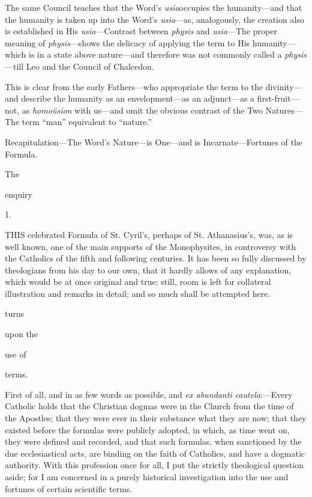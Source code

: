 The same Council teaches that
the Word's \emph{usia}occupies the humanity—and that the humanity
is taken up into the Word's \emph{usia}—as, analogously, the
creation also is established in His \emph{usia}—Contrast between \emph{physis}
and \emph{usia}—The proper meaning of \emph{physis}—shows the
delicacy of applying the term to His humanity—which is in a state
above nature—and therefore was not commonly called a \emph{physis}—till
Leo and the Council of Chalcedon.

This is clear from the early
Fathers—who appropriate the term to the divinity—and describe the
humanity as an envelopment—as an adjunct—as a first-fruit—not,
as \emph{homoüsion} with us—and omit the obvious contrast of the
Two Natures—The term ``man'' equivalent to ``nature.''

Recapitulation—The Word's
Nature—is One—and is Incarnate—Fortunes of the Formula.

\xsection{ }

The

enquiry


1.

THIS
celebrated Formula of St. Cyril's, perhaps of St. Athanasius's,
was, as is well known, one of the main supports of the
Monophysites, in controversy with the Catholics of the fifth
and following centuries. It has been so fully discussed by
theologians from his day to our own, that it hardly allows of
any explanation, which would be at once original and true;
still, room is left for collateral illustration and remarks in
detail; and so much shall be attempted here.

turns

upon
the

use of

terms.

First of all, and in as few words as possible, and \emph{ex
abundanti cautela}:—Every Catholic holds that the
Christian dogmas were in the Church from the time of the
Apostles; that they were ever in their substance what they are
now; that they existed before the formulas were publicly
adopted, in which, as time went on, they were defined and
recorded, and that such formulas, when sanctioned by the due
ecclesiastical acts, are binding on the faith of Catholics,
and have a dogmatic authority. With this profession once
for all, I put the strictly theological question aside; for I
am concerned in a purely historical investigation into the use
and fortunes of certain scientific terms.

